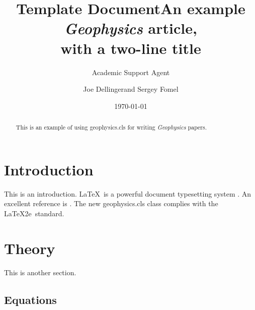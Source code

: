\documentclass{article}
\title{Template Document}
\author{Academic Support Agent}
\date{\today}
\begin{document}
\maketitle

\title{An example \emph{Geophysics} article, \\ with a two-line title}

\renewcommand{\thefootnote}{\fnsymbol{footnote}} 

\address{
\footnotemark[1]BP UTG, \\
200 Westlake Park Blvd, \\
Houston, TX, 77079 \\
\footnotemark[2]Bureau of Economic Geology, \\
John A. and Katherine G. Jackson School of Geosciences \\
The University of Texas at Austin \\
University Station, Box X \\
Austin, TX 78713-8924}
\author{Joe Dellinger\footnotemark[1] and Sergey Fomel\footnotemark[2]}


\maketitle

\begin{abstract}
  This is an example of using \textsf{geophysics.cls} for writing
  \emph{Geophysics} papers.
\end{abstract}

\section{Introduction}

This is an introduction. \LaTeX\ is a powerful document typesetting
system \cite[]{lamport}. An excellent reference is \cite[]{kopka}. The
new \textsf{geophysics.cls} class complies with the \LaTeX2e\
standard.

\section*{Theory}

This is another section. 

\subsection{Equations}
\end{document}
